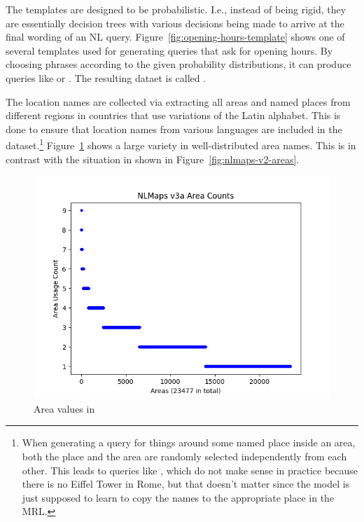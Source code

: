 The templates are designed to be probabilistic. I.e., instead of being rigid,
they are essentially decision trees with various decisions being made to arrive
at the final wording of an NL query. Figure~\ref{fig:opening-hours-template}
shows one of several templates used for generating queries that ask for opening
hours. By choosing phrases according to the given probability distributions, it
can produce queries like  or . The resulting dataet is called
\nlmapsthreea{}.

The location names are collected via extracting all areas and named places from
different regions in countries that use variations of the Latin alphabet. This
is done to ensure that location names from various languages are included in the
dataset.\footnote{When generating a query for things around some named place
  inside an area, both the place and the area are randomly selected
  independently from each other. This leads to queries like , which do not make sense in practice because there is
  no Eiffel Tower in Rome, but that doesn’t matter since the model is just
  supposed to learn to copy the names to the appropriate place in the MRL.}
Figure~\ref{fig:nlmaps-v3a-areas} shows a large variety in
well-distributed area names. This is in contrast with the situation in
\nlmapstwo{} shown in Figure~\ref{fig:nlmaps-v2-areas}.

\begin{figure}[h]
  \centering
  \includegraphics[width=\textwidth]{fig/nlmaps_v3a_area_counts.png}
  \caption{Area values in \nlmapsthreea{}}
  \label{fig:nlmaps-v3a-areas}
\end{figure}

